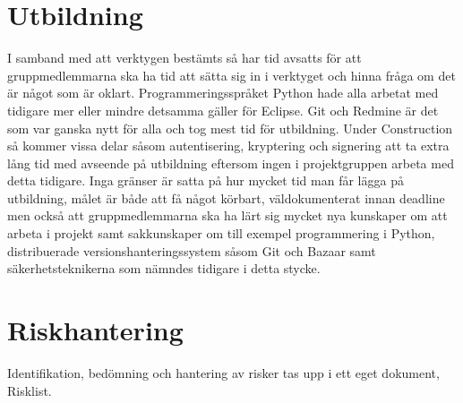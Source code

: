 \section{Utbildning}
I samband med att verktygen bestämts så har tid avsatts för att gruppmedlemmarna ska ha tid att sätta sig in i verktyget och hinna fråga om det är något som är oklart. Programmeringsspråket Python hade alla arbetat med tidigare mer eller mindre detsamma gäller för Eclipse. Git och Redmine är det som var ganska nytt för alla och tog mest tid för utbildning. Under Construction så kommer vissa delar såsom autentisering, kryptering och signering att ta extra lång tid med avseende på utbildning eftersom ingen i projektgruppen arbeta med detta tidigare. Inga gränser är satta på hur mycket tid man får lägga på utbildning, målet är både att få något körbart, väldokumenterat innan deadline men också att gruppmedlemmarna ska ha lärt sig mycket nya kunskaper om att arbeta i projekt samt sakkunskaper om till exempel programmering i Python, distribuerade versionshanteringssystem såsom Git och Bazaar samt säkerhetsteknikerna som nämndes tidigare i detta stycke.

\section{Riskhantering}
Identifikation, bedömning och hantering av risker tas upp i ett eget dokument, Risklist.


